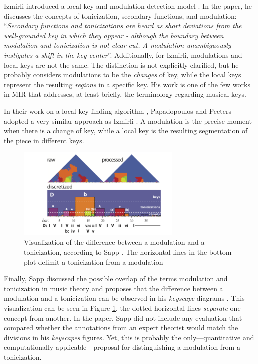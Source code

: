 Izmirli introduced a local key and modulation detection model \cite{izmirli_localized_2007}. In the paper, he discusses the concepts of tonicization, secondary functions, and modulation: ``\emph{Secondary functions and tonicizations are heard as short deviations from the well-grounded key in which they appear - although the boundary between modulation and tonicization is not clear cut. A modulation unambiguously instigates a shift in the key center}''. Additionally, for Izmirli, modulations and local keys are not the same. The distinction is not explicitly clarified, but he probably considers modulations to be the \emph{changes} of key, while the local keys represent the resulting \emph{regions} in a specific key. His work is one of the few works in MIR that addresses, at least briefly, the terminology regarding musical keys. 

In their work on a local key-finding algorithm \cite{papadopoulos_local_2009}, Papadopoulos and Peeters adopted a very similar approach as Izmirli \cite{izmirli_localized_2007}. A modulation is the precise moment when there is a change of key, while a local key is the resulting segmentation of the piece in different keys.

\begin{figure}[h]
    \centering
    \includegraphics[width=0.7\textwidth]{figures/Q5_1.png}
    \caption{Visualization of the difference between a modulation and a tonicization, according to Sapp \cite{sapp_computational_2011}. The horizontal lines in the bottom plot delimit a tonicization from a modulation}
    \label{fig:Q5_1}
\end{figure}

Finally, Sapp discussed the possible overlap of the terms modulation and tonicization in music theory and proposes that the difference between a modulation and a tonicization can be observed in his \emph{keyscape} diagrams \cite{sapp_computational_2011}. This visualization can be seen in Figure \ref{fig:Q5_1}, the dotted horizontal lines \emph{separate} one concept from another. In the paper, Sapp did not include any evaluation that compared whether the annotations from an expert theorist would match the divisions in his \emph{keyscapes} figures. Yet, this is probably the only---quantitative and computationally-applicable---proposal for distinguishing a modulation from a tonicization.


